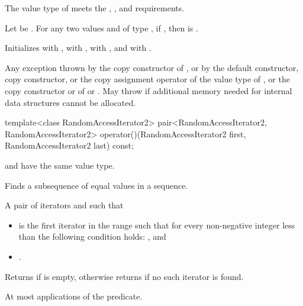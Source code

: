 \begin{itemdescr}
\pnum
\expects
The value type of  meets
the ,
, and
 requirements.

\pnum
Let  be .
For any two values  and  of type ,
if , then  is .

\pnum
\effects
Initializes
 with ,
 with ,
 with , and
\mbox{} with .

\pnum
\throws
Any exception thrown by the copy constructor of ,
or by the default constructor, copy constructor, or the copy assignment operator of the value type of ,
or the copy constructor or  of  or .
May throw  if additional memory needed for internal data structures cannot be allocated.
\end{itemdescr}

%
\begin{itemdecl}
template<class RandomAccessIterator2>
  pair<RandomAccessIterator2, RandomAccessIterator2>
    operator()(RandomAccessIterator2 first, RandomAccessIterator2 last) const;
\end{itemdecl}

\begin{itemdescr}
\pnum
\mandates
{} and 
have the same value type.

\pnum
\effects
Finds a subsequence of equal values in a sequence.

\pnum
\returns
A pair of iterators  and  such that
\begin{itemize}
\item {} is the first iterator
in the range  such that
for every non-negative integer  less than 
the following condition holds:
, and
\item {}.
\end{itemize}
Returns  if  is empty,
otherwise returns  if no such iterator is found.

\pnum
\complexity
At most  applications of the predicate.
\end{itemdescr}

